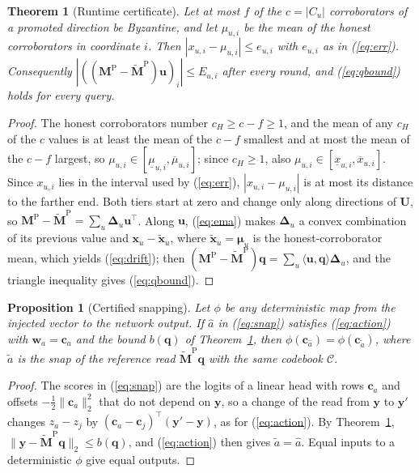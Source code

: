 \documentclass[journal]{IEEEtran}
\newtheorem{theorem}{Theorem}
\newtheorem{proposition}{Proposition}
\theoremstyle{remark}
\newcommand{\Mp}{\bm{M}^{\mathrm{P}}}
\newcommand{\Mpref}{\widetilde{\bm{M}}^{\mathrm{P}}}
\begin{document}
\begin{theorem}[Runtime certificate]\label{thm:cert}
Let at most $f$ of the $c=|C_u|$ corroborators of a promoted direction be Byzantine, and let $\mu_{u,i}$ be the mean of the honest corroborators in coordinate $i$. Then $|x_{u,i}-\mu_{u,i}|\le e_{u,i}$ with $e_{u,i}$ as in (\ref{eq:err}). Consequently $|((\Mp-\Mpref)\bm{u})_i|\le E_{u,i}$ after every round, and (\ref{eq:qbound}) holds for every query.
\end{theorem}
\begin{proof}
The honest corroborators number $c_H\ge c-f\ge 1$, and the mean of any $c_H$ of the $c$ values is at least the mean of the $c-f$ smallest and at most the mean of the $c-f$ largest, so $\mu_{u,i}\in[\underline{\mu}_{u,i},\overline{\mu}_{u,i}]$; since $c_H\ge 1$, also $\mu_{u,i}\in[\underline{x}_{u,i},\overline{x}_{u,i}]$. Since $x_{u,i}$ lies in the interval used by (\ref{eq:err}), $|x_{u,i}-\mu_{u,i}|$ is at most its distance to the farther end. Both tiers start at zero and change only along directions of $\bm{U}$, so $\Mp-\Mpref=\sum_u\bm{\Delta}_u\bm{u}^{\top}$. Along $\bm{u}$, (\ref{eq:ema}) makes $\bm{\Delta}_u$ a convex combination of its previous value and $\bm{x}_u-\tilde{\bm{x}}_u$, where $\tilde{\bm{x}}_u=\bm{\mu}_u$ is the honest-corroborator mean, which yields (\ref{eq:drift}); then $(\Mp-\Mpref)\bm{q}=\sum_u\langle\bm{u},\bm{q}\rangle\bm{\Delta}_u$, and the triangle inequality gives (\ref{eq:qbound}).
\end{proof}

\begin{proposition}[Certified snapping]\label{prop:snap}
Let $\phi$ be any deterministic map from the injected vector to the network output. If $\hat{a}$ in (\ref{eq:snap}) satisfies (\ref{eq:action}) with $\bm{w}_a=\bm{c}_a$ and the bound $b(\bm{q})$ of Theorem~\ref{thm:cert}, then $\phi(\bm{c}_{\hat a})=\phi(\bm{c}_{\tilde a})$, where $\tilde{a}$ is the snap of the reference read $\Mpref\bm{q}$ with the same codebook $\mathcal{C}$.
\end{proposition}
\begin{proof}
The scores in (\ref{eq:snap}) are the logits of a linear head with rows $\bm{c}_a$ and offsets $-\frac{1}{2}\|\bm{c}_a\|_2^2$ that do not depend on $\bm{y}$, so a change of the read from $\bm{y}$ to $\bm{y}'$ changes $z_a-z_j$ by $(\bm{c}_a-\bm{c}_j)^{\top}(\bm{y}'-\bm{y})$, as for (\ref{eq:action}). By Theorem~\ref{thm:cert}, $\|\bm{y}-\Mpref\bm{q}\|_2\le b(\bm{q})$, and (\ref{eq:action}) then gives $\tilde{a}=\hat{a}$. Equal inputs to a deterministic $\phi$ give equal outputs.
\end{proof}
\end{document}
